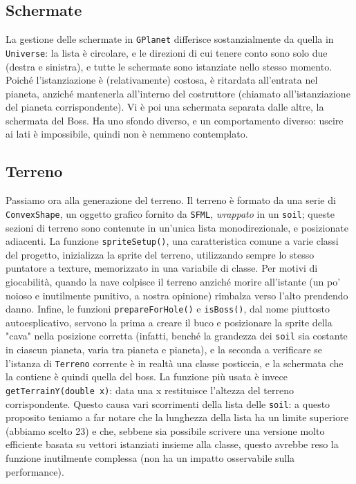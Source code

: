 \documentclass{article}
\begin{document}
\subsection{Schermate}
La gestione delle schermate in \lstinline{GPlanet} differisce sostanzialmente da quella in \lstinline{Universe}: la lista è circolare, e le direzioni di cui tenere conto sono solo due (destra e sinistra), e tutte le schermate sono istanziate nello stesso momento. Poiché l'istanziazione è (relativamente) costosa, è ritardata all'entrata nel pianeta, anziché mantenerla all'interno del costruttore (chiamato all'istanziazione del pianeta corrispondente). Vi è poi una schermata separata dalle altre, la schermata del Boss. Ha uno sfondo diverso, e un comportamento diverso: uscire ai lati è impossibile, quindi non è nemmeno contemplato.
\subsection{Terreno}
Passiamo ora alla generazione del terreno. Il terreno è formato da una serie di \lstinline{ConvexShape}, un oggetto grafico fornito da \lstinline{SFML}, \textit{wrappato} in un \lstinline{soil}; queste sezioni di terreno sono contenute in un'unica lista monodirezionale, e posizionate adiacenti. La funzione \lstinline{spriteSetup()}, una caratteristica comune a varie classi del progetto, inizializza la sprite del terreno, utilizzando sempre lo stesso puntatore a texture, memorizzato in una variabile di classe. Per motivi di giocabilità, quando la nave colpisce il terreno anziché morire all'istante (un po' noioso e inutilmente punitivo, a nostra opinione) rimbalza verso l'alto prendendo danno. Infine, le funzioni \lstinline{prepareForHole()} e \lstinline{isBoss()}, dal nome piuttosto autoesplicativo, servono la prima a creare il buco e posizionare la sprite della "cava" nella posizione corretta (infatti, benché la grandezza dei \lstinline{soil} sia costante in ciascun pianeta, varia tra pianeta e pianeta), e la seconda a verificare se l'istanza di \lstinline{Terreno} corrente è in realtà una classe posticcia, e la schermata che la contiene è quindi quella del boss. La funzione più usata è invece \lstinline{getTerrainY(double x)}: data una x restituisce l'altezza del terreno corrispondente. Questo causa vari scorrimenti della lista delle \lstinline{soil}: a questo proposito teniamo a far notare che la lunghezza della lista ha un limite superiore (abbiamo scelto 23) e che, sebbene sia possibile scrivere una versione molto efficiente basata su vettori istanziati insieme alla classe, questo avrebbe reso la funzione inutilmente complessa (non ha un impatto osservabile sulla performance).
\end{document}
